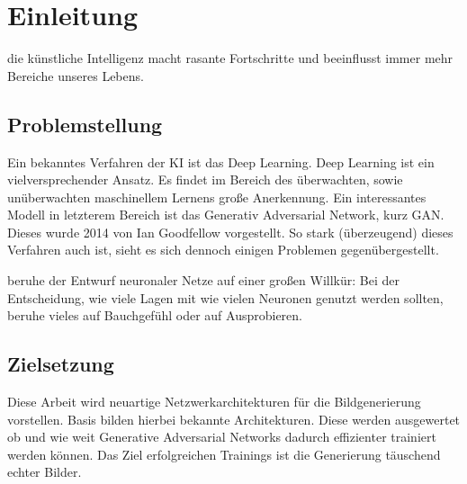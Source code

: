 \section{Einleitung}

\glqq die künstliche Intelligenz macht rasante Fortschritte und beeinflusst immer mehr Bereiche unseres Lebens.\grqq \cite{2}


\subsection{Problemstellung}
Ein bekanntes Verfahren der KI ist das Deep Learning. Deep Learning ist ein vielversprechender Ansatz. Es findet im Bereich des überwachten, sowie unüberwachten maschinellem Lernens große Anerkennung. Ein interessantes Modell in letzterem Bereich ist das Generativ Adversarial Network, kurz GAN. Dieses wurde 2014 von Ian Goodfellow vorgestellt. 
So stark (überzeugend) dieses Verfahren auch ist, sieht es sich dennoch einigen Problemen gegenübergestellt. 

\glqq beruhe der Entwurf neuronaler Netze auf einer großen Willkür: Bei der Entscheidung, wie viele Lagen mit wie vielen Neuronen genutzt werden sollten, beruhe vieles auf Bauchgefühl oder auf Ausprobieren.\grqq{} \cite[S.44]{3}

\subsection{Zielsetzung}
Diese Arbeit wird neuartige Netzwerkarchitekturen für die Bildgenerierung vorstellen. Basis bilden hierbei bekannte Architekturen. Diese werden ausgewertet ob und wie weit Generative Adversarial Networks dadurch effizienter trainiert werden können. Das Ziel erfolgreichen Trainings ist die Generierung täuschend echter Bilder.  